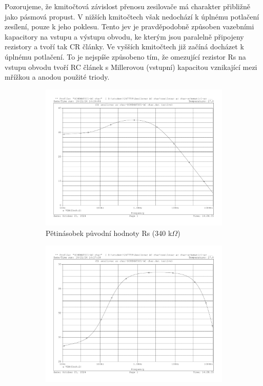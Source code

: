 \documentclass[a4paper, czech]{article}
\begin{document}
Pozorujeme, že kmitočtová závislost přenosu zesilovače má charakter přibližně jako pásmová propust.
V nižších kmitočtech však nedochází k úplnému potlačení zesílení, pouze k jeho poklesu.
Tento jev je pravděpodobně způsoben vazebními kapacitory na vstupu a výstupu obvodu, ke kterým jsou paralelně připojeny rezistory a tvoří tak CR články. 
Ve vyšších kmitočtech již začíná docházet k úplnému potlačení.
To je nejspíše způsobeno tím, že omezující rezistor Rs na vstupu obvodu tvoří RC článek s Millerovou (vstupní) kapacitou vznikající mezi mřížkou a anodou použité triody.

\begin{figure}[H]
    \centering
    \begin{subfigure}{0.49\textwidth}
        \centering
        \includegraphics[width=\textwidth]{charakteristiky/uloha3_Rs_5krat_vetsi_340k.pdf}
        \caption{Pětinásobek původní hodnoty Rs (340 k$\Omega$)}
    \end{subfigure}
    \hfill
    \begin{subfigure}{0.49\textwidth}
        \centering
        \includegraphics[width=\textwidth]{charakteristiky/uloha3_Rs_5krat_mensi_13_6k.pdf}

\end{subfigure}
\end{figure}
\end{document}
